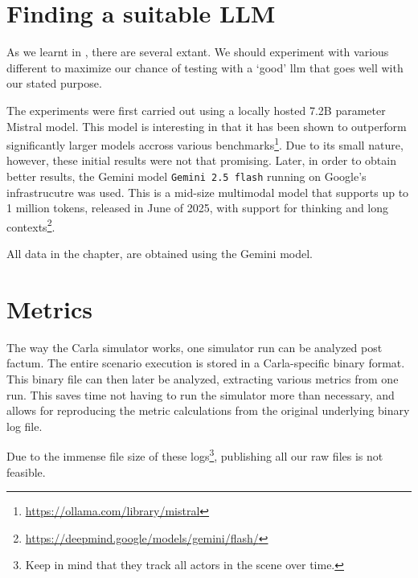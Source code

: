 \section{Finding a suitable LLM}

As we learnt in , there are several  extant. We should
experiment with various different  to maximize our chance of testing with a `good'
\acrshort{llm} that goes well with our stated purpose.

The experiments were first carried out using a locally hosted \num{7.2}B parameter Mistral model.
This model is interesting in that it has been shown to outperform significantly larger models
accross various benchmarks\footnote{\url{https://ollama.com/library/mistral}}. Due to its small
nature, however, these initial results were not that promising. Later, in order to obtain better
results, the Gemini model \texttt{Gemini 2.5 flash} running on Google's infrastrucutre was used.
This is a mid-size multimodal model that supports up to 1 million tokens, released in June of 2025,
with support for thinking and long
contexts\footnote{\url{https://deepmind.google/models/gemini/flash/}}.

All data in the  chapter, are obtained using the Gemini model.

\section{Metrics}

The way the Carla simulator works, one simulator run can be analyzed post factum. The entire
scenario execution is stored in a Carla-specific binary format. This binary file can then later be
analyzed, extracting various metrics from one run. This saves time not having to run the simulator
more than necessary, and allows for reproducing the metric calculations from the original underlying
binary log file.

Due to the immense file size of these logs\footnote{Keep in mind that they track all actors in the
    scene over time.}, publishing all our raw files is not feasible.
